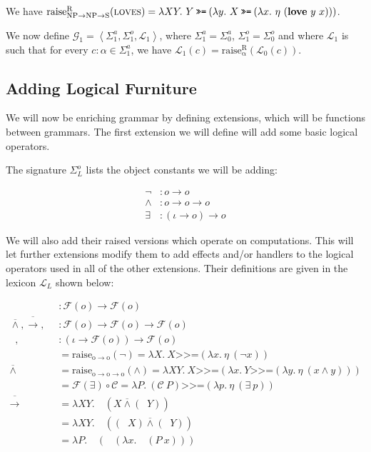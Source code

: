 \documentclass{article}
\newcommand{\hsbind}{\mathbin{\texttt{>>=}}}
\newcommand{\abs}[1]{\textsc{#1}}
\newcommand{\obj}[1]{\textbf{#1}}
\newcommand{\dand}{\mathbin{\overline{\land}}}
\newcommand{\dnot}{\mathop{\overline{\lnot}}}
\newcommand{\dor}{\mathop{\overline{\lor}}}
\newcommand{\dimpl}{\mathbin{\overline{\to}}}
\newcommand{\dexists}{\mathop{\overline{\exists}}}
\newcommand{\dforall}{\mathop{\overline{\forall}}}
\begin{document}
We have $\mathrm{raise^R_{NP \to NP \to S}}(\abs{loves}) = \lambda X
Y.\ Y \hsbind (\lambda y.\ X \hsbind (\lambda
x.\ \eta\ (\obj{love}\ y\ x)))$.

We now define $\mathcal{G}_1 = \left< \Sigma^a_1, \Sigma^o_1, \mathcal{L}_1
\right>$, where $\Sigma^a_1 = \Sigma^a_0$, $\Sigma^o_1 = \Sigma^o_0$ and
where $\mathcal{L}_1$ is such that for every $c : \alpha \in \Sigma^a_1$,
we have $\mathcal{L}_1(c) =
\mathrm{raise^R_\alpha}(\mathcal{L}_0(c))$.


\subsection{Adding Logical Furniture}

We will now be enriching grammar by defining extensions, which will be
functions between grammars. The first extension we will define will add
some basic logical operators.

The signature $\Sigma^o_L$ lists the object constants we will be
adding:

\begin{align*}
  \lnot &: o \to o \\
  \land &: o \to o \to o \\
  \exists &: (\iota \to o) \to o
\end{align*}

We will also add their raised versions which operate on computations. This
will let further extensions modify them to add effects and/or handlers to
the logical operators used in all of the other extensions. Their
definitions are given in the lexicon $\mathcal{L}_L$ shown below:

\begin{align*}
  \dnot &: \mathcal{F}(o) \to \mathcal{F}(o) \\
  \dand, \dimpl, \dor &: \mathcal{F}(o) \to \mathcal{F}(o) \to \mathcal{F}(o) \\
  \dexists, \dforall &: (\iota \to \mathcal{F}(o)) \to \mathcal{F}(o) \\
  \dnot &= \mathrm{raise_{o \to o}}(\lnot) = \lambda X.\ X \hsbind (\lambda x.\ \eta\ (\lnot x)) \\
  \dand &= \mathrm{raise_{o \to o \to o}}(\land) = \lambda X Y.\ X \hsbind (\lambda x.\ Y \hsbind (\lambda y.\ \eta\ (x \land y))) \\
  \dexists &= \mathcal{F}(\exists) \circ \mathcal{C} = \lambda P.\ (\mathcal{C}\ P) \hsbind (\lambda p.\ \eta\ (\exists\ p)) \\
  \dimpl &= \lambda X Y.\ \dnot\ (X \dand (\dnot Y)) \\
  \dor &= \lambda X Y.\ \dnot\ ((\dnot X) \dand (\dnot Y)) \\
  \dforall &= \lambda P.\ \dnot\ (\dexists\ (\lambda x.\ \dnot\ (P\ x)))
\end{align*}
\end{document}
